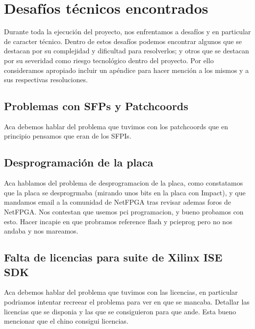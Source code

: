 
\chapter{Desaf\'ios t\'ecnicos encontrados}

\ifpdf
    \graphicspath{{Appendix2/Figs/Raster/}{Appendix2/Figs/PDF/}{Appendix2/Figs/}}
\else
    \graphicspath{{Appendix2/Figs/Vector/}{Appendix2/Figs/}}
\fi

Durante toda la ejecuci\'on del proyecto, nos enfrentamos a desaf\'ios y en particular de caracter t\'ecnico. Dentro de estos desaf\'ios podemos encontrar algunos que se destacan por su complejidad y dificultad para resolverlos; y otros que se destacan por su severidad como riesgo tecnol\'ogico dentro del proyecto. Por ello consideramos apropiado incluir un ap\'endice para hacer menci\'on a los mismos y a sus respectivas resoluciones.

\section{Problemas con SFPs y Patchcoords}

Aca debemos hablar del problema que tuvimos con los patchcoords que en principio pensamos que eran de los SFPIs.

\section{Desprogramaci\'on de la placa}
Aca hablamos del problema de desprogramacion de la placa, como constatamos que la placa se desprogrmaba (mirando unos bits en la placa con Impact), y que mandamos email a la comunidad de NetFPGA tras revisar  ademas foros de NetFPGA. Nos contestan que usemos pci programacion, y bueno probamos con esto. Hacer incapie en que probramos reference flash y pcieprog pero no nos andaba y nos mareamos.

\section{Falta de licencias para suite de Xilinx ISE SDK}

Aca debemos hablar del problema que tuvimos con las licencias, en particular podriamos intentar recreear el problema para ver en que se mancaba. Detallar las licencias que se disponia y las que se consiguieron para que ande.
Esta bueno mencionar que el chino consigui licencias.

